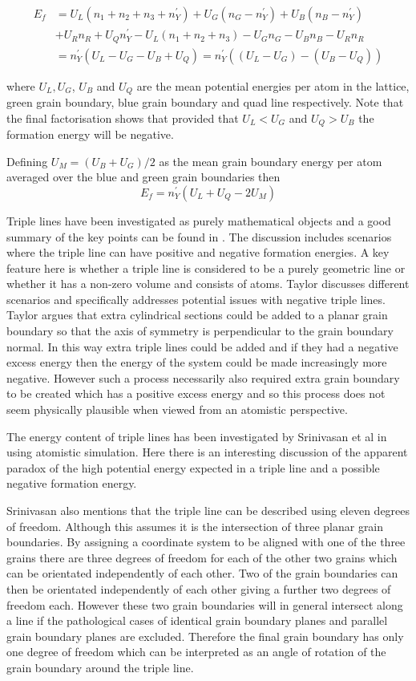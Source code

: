 \documentclass[12pt,a4paper]{book}
\begin{document}
\begin{align*}
 E_f &= U_L(n_1+n_2+n_3+n_Y^{\prime}) + U_G(n_G - n_Y^{\prime})
+ U_B(n_B - n_Y^{\prime}) \\ 
&+ U_R n_R + U_Q n_Y^{\prime}
- U_L(n_1+n_2+n_3) - U_G n_G - U_B n_B - U_R n_R  
\\ 
&=  n_Y^{\prime}(U_L - U_G - U_B + U_Q) = n_Y^{\prime}((U_L - U_G) - (U_B - U_Q)) 
\end{align*}

where $U_L, U_G$, $U_B$ and $U_Q$ are the mean potential energies per atom in the lattice, green grain boundary, blue grain boundary
and quad line respectively. Note that the final factorisation shows that provided that $U_L < U_G$ and $U_Q > U_B$ the formation energy will be negative.

Defining $U_M = (U_B + U_G)/2$ as the mean grain boundary energy per atom averaged over the blue and green grain boundaries then
\[E_f =  n_Y^{\prime}(U_L + U_Q - 2U_M)\]
 
Triple lines have been investigated as purely mathematical objects and a good summary of the key points can be found in \cite{Taylor1999}. The discussion includes scenarios where the triple line can have positive and negative formation energies. A key feature here is whether a triple line is considered to be a purely geometric line or whether it has a non-zero volume and consists of atoms. Taylor discusses different scenarios and specifically addresses potential issues with negative triple lines. Taylor argues that extra cylindrical sections could be added to a planar grain boundary so that the axis of symmetry is perpendicular to the grain boundary normal. In this way extra triple lines could be added and if they had a negative excess energy then the energy of the system could be made increasingly more negative. However such a process necessarily also required extra grain boundary to be created which has a positive excess energy and so this process does not seem physically plausible when viewed from an atomistic perspective.


The energy content of triple lines has been investigated by Srinivasan et al in \cite{Srinivasan1999} using atomistic simulation. Here there is an interesting discussion of the apparent paradox of the high potential energy expected in a triple line and a possible negative formation energy. 

Srinivasan also mentions that the triple line can be described using eleven degrees of freedom. Although this assumes it is the intersection of three planar grain boundaries. By assigning a coordinate system to be aligned with one of the three grains there are three degrees of freedom for each of the other two grains which can be orientated independently of each other. Two of the grain boundaries can then be orientated independently of each other giving a further two degrees of freedom each. However these two grain boundaries will in general intersect along a line if the pathological cases of identical grain boundary planes and parallel grain boundary planes are excluded. Therefore the final grain boundary has only one degree of freedom which can be interpreted as an angle of rotation of the grain boundary around the triple line.
\end{document}
